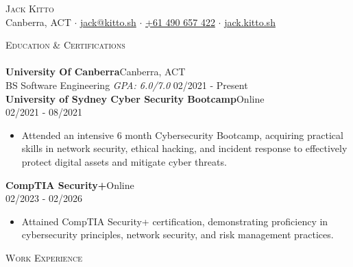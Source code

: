 \documentclass[a4paper]{article}
\newcommand{\lineunder} {
    \vspace*{-8pt} \\
    \hspace*{-18pt} \hrulefill \\
}
\newcommand{\header} [1] {
    {\hspace*{-18pt}\vspace*{6pt} \textsc{#1}}
    \vspace*{-6pt} \lineunder
}
\begin{document}
    \vspace*{-40pt}

\vspace*{-10pt}
\begin{center}
  {\Huge \scshape {Jack Kitto}}\\
  Canberra, ACT $\cdot$ \href{mailto:jack@kitto.sh}{jack@kitto.sh} $\cdot$ \href{tel:+61 490 657 422}{+61 490 657 422} $\cdot$ \url{jack.kitto.sh}\\
\end{center}

      \header{Education \& Certifications}

      \textbf{University Of Canberra}\hfill Canberra, ACT\\
BS Software Engineering \textit{GPA: 6.0/7.0} \hfill 02/2021 - Present\\

\vspace{2mm}
      \textbf{University of Sydney Cyber Security Bootcamp}\hfill Online\\
           \hfill 02/2021 - 08/2021\\
          \vspace{-1mm}
\begin{itemize} \itemsep 1pt
  \item Attended an intensive 6 month Cybersecurity Bootcamp, acquiring practical skills in network security, ethical hacking, and incident response to effectively protect digital assets and mitigate cyber threats.
\end{itemize}
          \vspace{2mm}
      \textbf{CompTIA Security+}\hfill Online\\
        \hfill 02/2023 - 02/2026\\
          \vspace{-1mm}
\begin{itemize} \itemsep 1pt
  \item Attained CompTIA Security+ certification, demonstrating proficiency in cybersecurity principles, network security, and risk management practices.
\end{itemize}
          \vspace{2mm}

      \header{Work Experience}
      \vspace{1mm}
\end{document}
